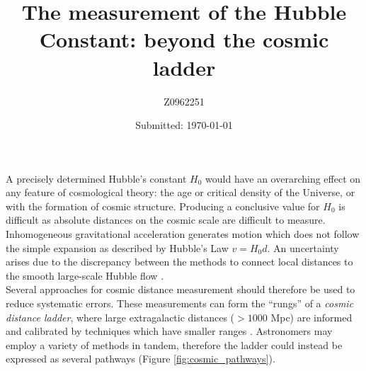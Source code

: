 \documentclass[12pt, onecolumn]{revtex4}    %
\begin{document}
                     


\title{The measurement of the Hubble Constant: beyond the cosmic ladder} 
\date{Submitted: \today{}}
\author{Z0962251}

\maketitle
\thispagestyle{plain} %

A precisely determined Hubble's constant $H_0$ would have an overarching effect on any feature of cosmological theory: the age or critical density of the Universe, or with the formation of cosmic structure. Producing a conclusive value for $H_0$ is difficult as absolute distances on the cosmic scale are difficult to measure. Inhomogeneous gravitational acceleration generates motion which does not follow the simple expansion as described by Hubble's Law $v=H_0 d$. An uncertainty arises due to the discrepancy between the methods to connect local distances to the smooth large-scale Hubble flow \citep{fukugita_cosmic}. \\

Several approaches for cosmic distance measurement should therefore be used to reduce systematic errors. These measurements can form the ``rungs'' of a \textit{cosmic distance ladder}, where large extragalactic distances ($>1000$ Mpc) are informed and calibrated by techniques which have smaller ranges \citep{carroll_astro}. Astronomers may employ a variety of methods in tandem, therefore the ladder could instead be expressed as several pathways (Figure \ref{fig:cosmic_pathways}). 

\end{document}
